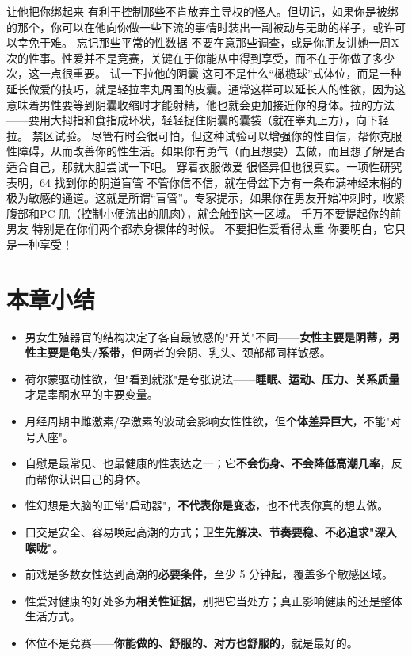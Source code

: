 \documentclass[12pt,UTF8,openany]{ctexbook}
\begin{document}
让他把你绑起来
有利于控制那些不肯放弃主导权的怪人。但切记，如果你是被绑的那个，你可以在他向你做一些下流的事情时装出一副被动与无助的样子，或许可以幸免于难。
忘记那些平常的性数据
不要在意那些调查，或是你朋友讲她一周X次的性事。性爱并不是竞赛，关键在于你能从中得到享受，而不在于你做了多少次，这一点很重要。
试一下拉他的阴囊
这可不是什么“橄榄球”式体位，而是一种延长做爱的技巧，就是轻拉睾丸周围的皮囊。通常这样可以延长人的性欲，因为这意味着男性要等到阴囊收缩时才能射精，他也就会更加接近你的身体。拉的方法——要用大拇指和食指成环状，轻轻捉住阴囊的囊袋（就在睾丸上方），向下轻拉。
禁区试验。
尽管有时会很可怕，但这种试验可以增强你的性自信，帮你克服性障碍，从而改善你的性生活。如果你有勇气（而且想要）去做，而且想了解是否适合自己，那就大胆尝试一下吧。
穿着衣服做爱
很怪异但也很真实。一项性研究表明，64%
找到你的阴道盲管
不管你信不信，就在骨盆下方有一条布满神经末梢的极为敏感的通道。这就是所谓“盲管”。专家提示，如果你在男友开始冲刺时，收紧腹部和PC 肌（控制小便流出的肌肉），就会触到这一区域。
千万不要提起你的前男友
特别是在你们两个都赤身裸体的时候。
不要把性爱看得太重
你要明白，它只是一种享受！

\section{本章小结}

\begin{itemize}[leftmargin=2em,itemsep=0.3em]
  \item 男女生殖器官的结构决定了各自最敏感的"开关"不同——\textbf{女性主要是阴蒂，男性主要是龟头/系带}，但两者的会阴、乳头、颈部都同样敏感。
  \item 荷尔蒙驱动性欲，但"看到就涨"是夸张说法——\textbf{睡眠、运动、压力、关系质量}才是睾酮水平的主要变量。
  \item 月经周期中雌激素/孕激素的波动会影响女性性欲，但\textbf{个体差异巨大}，不能"对号入座"。
  \item 自慰是最常见、也最健康的性表达之一；它\textbf{不会伤身、不会降低高潮几率}，反而帮你认识自己的身体。
  \item 性幻想是大脑的正常"启动器"，\textbf{不代表你是变态}，也不代表你真的想去做。
  \item 口交是安全、容易唤起高潮的方式；\textbf{卫生先解决、节奏要稳、不必追求"深入喉咙"}。
  \item 前戏是多数女性达到高潮的\textbf{必要条件}，至少 5 分钟起，覆盖多个敏感区域。
  \item 性爱对健康的好处多为\textbf{相关性证据}，别把它当处方；真正影响健康的还是整体生活方式。
  \item 体位不是竞赛——\textbf{你能做的、舒服的、对方也舒服的}，就是最好的。
\end{itemize}
\end{document}
